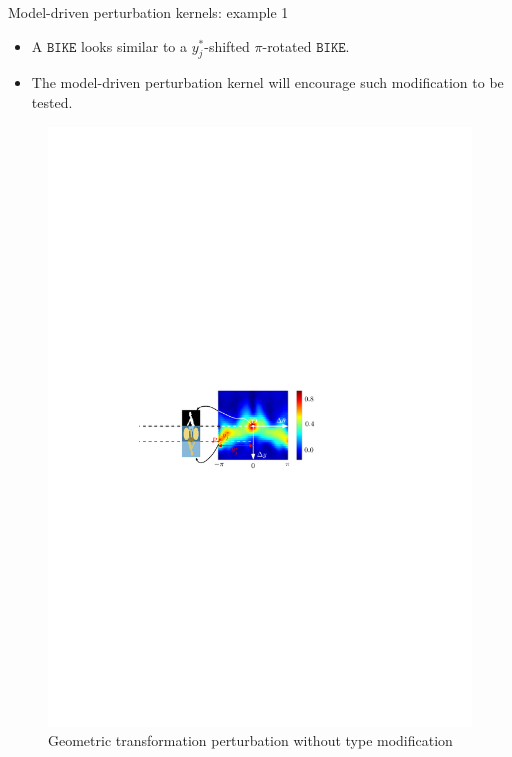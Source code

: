 \documentclass{beamer}
\begin{document}
\begin{frame}{Model-driven perturbation kernels: example 1}
\begin{itemize}
\item A $\texttt{BIKE}$ looks similar to a $y_j^*$-shifted $\pi$-rotated $\texttt{BIKE}$.
\item The model-driven perturbation kernel will encourage such modification to be tested.
\end{itemize}

\begin{figure}
\centering
\includegraphics[width = 0.9\linewidth]{correlation_velo_velo}
\caption{Geometric transformation perturbation without type modification}
\end{figure}
\end{frame}
\end{document}
